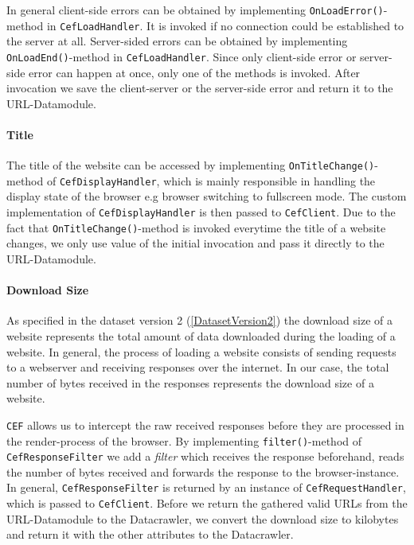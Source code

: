 In general client-side errors can be obtained by implementing \texttt{OnLoadError()}-method in \texttt{CefLoadHandler}. It is invoked if no connection could be established to the server at all. Server-sided errors can be obtained by implementing \texttt{OnLoadEnd()}-method in \texttt{CefLoadHandler}. Since only client-side error or server-side error can happen at once, only one of the methods is invoked. After invocation we save the client-server or the server-side error and return it to the URL-Datamodule.

\paragraph{Title}
The title of the website can be accessed by implementing \texttt{OnTitleChange()}-method of \texttt{CefDisplayHandler}, which is mainly responsible in handling the display state of the browser e.g browser switching to fullscreen mode. The custom implementation of \texttt{CefDisplayHandler} is then passed to \texttt{CefClient}. Due to the fact that \texttt{OnTitleChange()}-method is invoked everytime the title of a website changes, we only use value of the initial invocation and pass it directly to the URL-Datamodule.

\paragraph{Download Size}
As specified in the dataset version 2 (\ref{DatasetVersion2}) the download size of a website represents the total amount of data downloaded during the loading of a website. In general, the process of loading a website consists of sending requests to a webserver and receiving responses over the internet. In our case, the total number of bytes received in the responses represents the download size of a website.

\texttt{CEF} allows us to intercept the raw received responses before they are processed in the render-process of the browser. By implementing \texttt{filter()}-method of \texttt{CefResponseFilter} we add a \textit{filter} which receives the response beforehand, reads the number of bytes received and forwards the response to the browser-instance. In general, \texttt{CefResponseFilter} is returned by an instance of \texttt{CefRequestHandler}, which is passed to \texttt{CefClient}. Before we return the gathered valid URLs from the URL-Datamodule to the Datacrawler, we convert the download size to kilobytes and return it with the other attributes to the Datacrawler.

